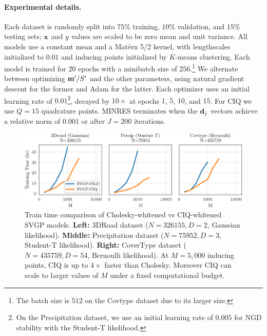 \paragraph{Experimental details.}
Each dataset is randomly split into $75\%$ training, $10\%$ validation, and $15\%$ testing sets; $\mathbf{x}$ and $y$ values are scaled to be zero mean and unit variance.
All models use a constant mean and a Mat\'ern 5/2 kernel, with lengthscales initialized to $0.01$ and inducing points initialized by $K$-means clustering.
Each model is trained for $20$ epochs with a minibatch size of $256.$\footnote{
  The batch size is $512$ on the Covtype dataset due to its larger size.
}
We alternate between optimizing $\mathbf{m}'/S'$ and the other parameters, using natural gradient descent for the former and Adam \cite{kingma2014adam} for the latter.
Each optimizer uses an initial learning rate of $0.01$\footnote{
  On the Precipitation dataset, we use an initial learning rate of $0.005$ for  NGD stability with the Student-T likelihood.
}, decayed by $10\times$ at epochs $1$, $5$, $10$, and $15$.
For CIQ we use $Q = 15$ quadrature points.
MINRES terminates when the $\mathbf{d}_j$ vectors achieve a relative norm of $0.001$ or after $J=200$ iterations.

\begin{figure}[t!]
  \centering
  \includegraphics[width=\linewidth]{figures/variational_time.pdf}
  \caption[Train time comparison of Cholesky-whitened vs CIQ-whitened SVGP models.]{
    Train time comparison of Cholesky-whitened vs CIQ-whitened SVGP models.
    {\bf Left:} 3DRoad dataset ($N=326155, D=2$, Gaussian likelihood).
    {\bf Middle:} Precipitation dataset ($N=75952, D=3$, Student-T likelihood).
    {\bf Right:} CoverType dataset ($N=435759, D=54$, Bernoulli likelihood).
    At $M=5,\!000$ inducing points, CIQ is up to $4\times$ faster than Cholesky.
    Moreover CIQ can scale to larger values of $M$ under a fixed computational budget.
  }
  \label{fig:variational_timing}
\end{figure}


